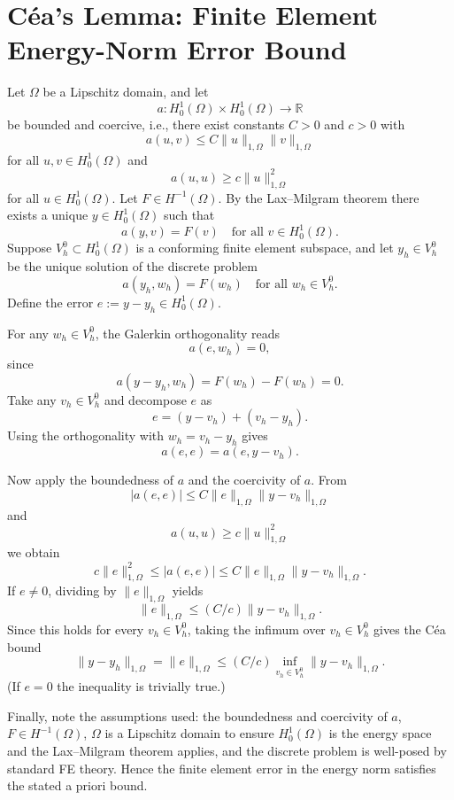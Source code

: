 \documentclass[11pt]{article}
\begin{document}
\section*{Céa’s Lemma: Finite Element Energy-Norm Error Bound}

Let $\Omega$ be a Lipschitz domain, and let
\[ a: H^1_0(\Omega) \times H^1_0(\Omega) \to \mathbb{R} \]
be bounded and coercive, i.e., there exist constants $C>0$ and $c>0$ with
\[ a(u,v) \le C\|u\|_{1,\Omega}\|v\|_{1,\Omega} \]
for all $u,v \in H^1_0(\Omega)$ and
\[ a(u,u) \ge c\|u\|_{1,\Omega}^2 \]
for all $u \in H^1_0(\Omega)$. Let $F \in H^{-1}(\Omega)$. By the Lax--Milgram theorem there exists a unique $y \in H^1_0(\Omega)$ such that
\[ a(y,v) = F(v) \quad \text{for all } v \in H^1_0(\Omega). \]
Suppose $V^0_h \subset H^1_0(\Omega)$ is a conforming finite element subspace, and let $y_h \in V^0_h$ be the unique solution of the discrete problem
\[ a(y_h,w_h) = F(w_h) \quad \text{for all } w_h \in V^0_h. \]
Define the error $e := y - y_h \in H^1_0(\Omega)$.

For any $w_h \in V^0_h$, the Galerkin orthogonality reads
\[ a(e,w_h) = 0, \]
since
\[ a(y - y_h, w_h) = F(w_h) - F(w_h) = 0. \]
Take any $v_h \in V^0_h$ and decompose $e$ as
\[ e = (y - v_h) + (v_h - y_h). \]
Using the orthogonality with $w_h = v_h - y_h$ gives
\[ a(e,e) = a(e,y - v_h). \]

Now apply the boundedness of $a$ and the coercivity of $a$. From
\[ |a(e,e)| \le C\|e\|_{1,\Omega}\|y - v_h\|_{1,\Omega} \]
and
\[ a(u,u) \ge c\|u\|_{1,\Omega}^2 \]
we obtain
\[ c\|e\|_{1,\Omega}^2 \le |a(e,e)| \le C\|e\|_{1,\Omega}\|y - v_h\|_{1,\Omega}. \]
If $e \neq 0$, dividing by $\|e\|_{1,\Omega}$ yields
\[ \|e\|_{1,\Omega} \le (C/c)\|y - v_h\|_{1,\Omega}. \]
Since this holds for every $v_h \in V^0_h$, taking the infimum over $v_h \in V^0_h$ gives the Céa bound
\[ \|y - y_h\|_{1,\Omega} = \|e\|_{1,\Omega} \le (C/c)\inf_{v_h \in V^0_h} \|y - v_h\|_{1,\Omega}. \]
(If $e = 0$ the inequality is trivially true.)

Finally, note the assumptions used: the boundedness and coercivity of $a$, $F \in H^{-1}(\Omega)$, $\Omega$ is a Lipschitz domain to ensure $H^1_0(\Omega)$ is the energy space and the Lax--Milgram theorem applies, and the discrete problem is well-posed by standard FE theory. Hence the finite element error in the energy norm satisfies the stated a priori bound.
\end{document}
